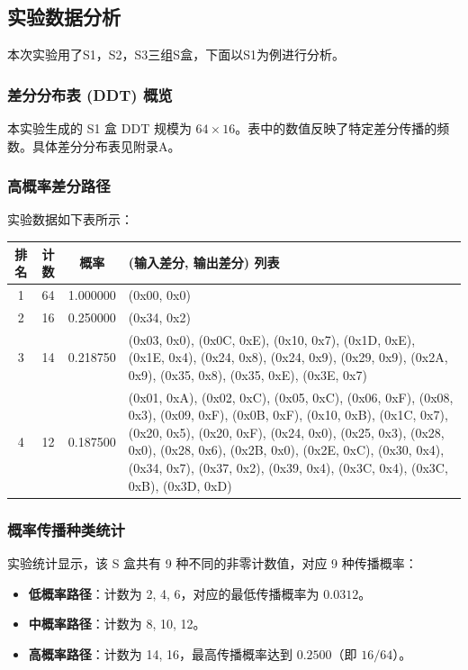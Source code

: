 \subsection{实验数据分析}
本次实验用了S1，S2，S3三组S盒，下面以S1为例进行分析。
\subsubsection{差分分布表 (DDT) 概览}
本实验生成的 S1 盒 DDT 规模为 $64 \times 16$。表中的数值反映了特定差分传播的频数。具体差分分布表见附录A。
\subsubsection{高概率差分路径}
实验数据如下表所示：

\begin{table}[H]
\centering
\caption{S1 盒高概率差分路径汇总表}
\begin{small}
\begin{longtable}{|c|c|c|p{8cm}|}
\hline
\textbf{排名} & \textbf{计数} & \textbf{概率} & \textbf{(输入差分, 输出差分) 列表} \\ \hline
1 & 64 & 1.000000 & (0x00, 0x0) \\ \hline
2 & 16 & 0.250000 & (0x34, 0x2) \\ \hline
3 & 14 & 0.218750 & (0x03, 0x0), (0x0C, 0xE), (0x10, 0x7), (0x1D, 0xE), (0x1E, 0x4), (0x24, 0x8), (0x24, 0x9), (0x29, 0x9), (0x2A, 0x9), (0x35, 0x8), (0x35, 0xE), (0x3E, 0x7) \\ \hline
4 & 12 & 0.187500 & (0x01, 0xA), (0x02, 0xC), (0x05, 0xC), (0x06, 0xF), (0x08, 0x3), (0x09, 0xF), (0x0B, 0xF), (0x10, 0xB), (0x1C, 0x7), (0x20, 0x5), (0x20, 0xF), (0x24, 0x0), (0x25, 0x3), (0x28, 0x0), (0x28, 0x6), (0x2B, 0x0), (0x2E, 0xC), (0x30, 0x4), (0x34, 0x7), (0x37, 0x2), (0x39, 0x4), (0x3C, 0x4), (0x3C, 0xB), (0x3D, 0xD) \\ \hline
\end{longtable}
\end{small}
\end{table}

\subsubsection{概率传播种类统计}
实验统计显示，该 S 盒共有 9 种不同的非零计数值，对应 9 种传播概率：
\begin{itemize}
    \item \textbf{低概率路径}：计数为 2, 4, 6，对应的最低传播概率为 $0.0312$。
    \item \textbf{中概率路径}：计数为 8, 10, 12。
    \item \textbf{高概率路径}：计数为 14, 16，最高传播概率达到 $0.2500$（即 $16/64$）。
\end{itemize}

